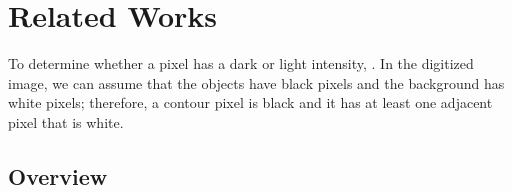 
\section{Related Works}


To determine whether a pixel has a dark or light intensity, . In the digitized image, we can assume that the objects have black pixels and the background has white pixels; therefore, a contour pixel is black and it has at least one adjacent pixel that is white.

\subsection{Overview}

